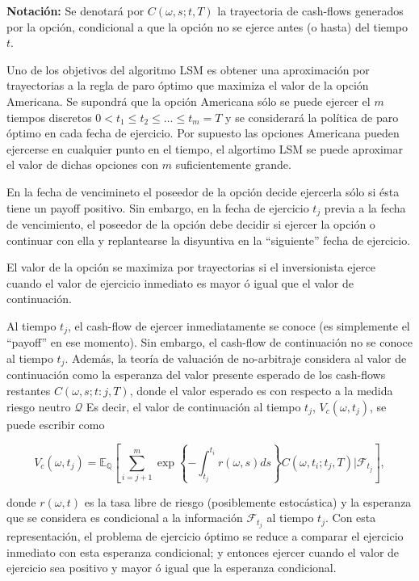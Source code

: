 \documentclass[12pt,reqno,letter]{article}
\begin{document}
	\textbf{Notación:} Se denotará por \(C(\omega, s; t,T)\) la trayectoria
	de cash-flows generados por la opción, condicional a que la opción no se
	ejerce antes (o hasta) del tiempo \(t\).
	
	Uno de los objetivos del algoritmo LSM es obtener una aproximación por
	trayectorias a la regla de paro óptimo que maximiza el valor de la
	opción Americana. Se supondrá que la opción Americana sólo se puede
	ejercer el \(m\) tiempos discretos
	\(0<t_1\leq t_2\leq \ldots \leq t_m=T\) y se considerará la política de
	paro óptimo en cada fecha de ejercicio. Por supuesto las opciones
	Americana pueden ejercerse en cualquier punto en el tiempo, el algortimo
	LSM se puede aproximar el valor de dichas opciones con \(m\)
	suficientemente grande.
	
	En la fecha de vencimineto el poseedor de la opción decide ejercerla
	sólo si ésta tiene un payoff positivo. Sin embargo, en la fecha de
	ejercicio \(t_j\) previa a la fecha de vencimiento, el poseedor de la
	opción debe decidir si ejercer la opción o continuar con ella y
	replantearse la disyuntiva en la ``siguiente'' fecha de ejercicio.
	
	El valor de la opción se maximiza por trayectorias si el inversionista
	ejerce cuando el valor de ejercicio inmediato es mayor ó igual que el
	valor de continuación.
	
	Al tiempo \(t_j\), el cash-flow de ejercer inmediatamente se conoce (es
	simplemente el ``payoff'' en ese momento). Sin embargo, el cash-flow de
	continuación no se conoce al tiempo \(t_j\). Además, la teoría de
	valuación de no-arbitraje considera al valor de continuación como la
	esperanza del valor presente esperado de los cash-flows restantes
	\(C(\omega,s;t:j,T)\), donde el valor esperado es con respecto a la
	medida riesgo neutro \(\mathcal{Q}\) Es decir, el valor de continuación
	al tiempo \(t_j\), \(V_c(\omega,t_j)\), se puede escribir como
	
	\[V_c(\omega,t_j) = \mathbb{E}_{\mathbb{Q}}\left[\sum_{i=j+1}^m \exp\left\{-\int_{t_j}^{t_i}r(\omega,s)ds\right\}C(\omega,t_i;t_j,T)|\mathcal{F}_{t_j}\right],\]
	
	donde \(r(\omega,t)\) es la tasa libre de riesgo (posiblemente
	estocástica) y la esperanza que se considera es condicional a la
	información \(\mathcal{F}_{t_j}\) al tiempo \(t_j\). Con esta
	representación, el problema de ejercicio óptimo se reduce a comparar el
	ejercicio inmediato con esta esperanza condicional; y entonces ejercer
	cuando el valor de ejercicio sea positivo y mayor ó igual que la
	esperanza condicional.
	
\end{document}
